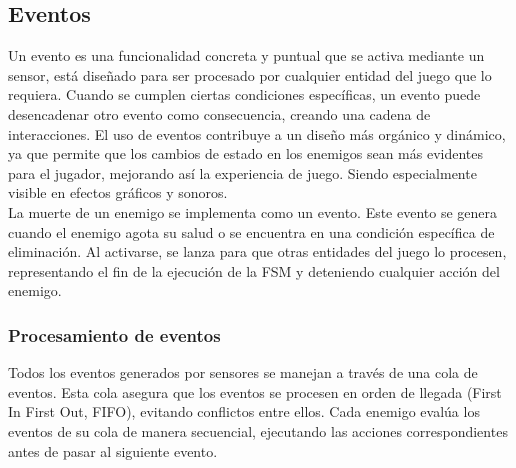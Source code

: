 \subsection{Eventos}

Un evento es una funcionalidad concreta y puntual que se activa mediante un sensor, está diseñado para ser procesado por cualquier entidad del juego que lo requiera.
Cuando se cumplen ciertas condiciones específicas, un evento puede desencadenar otro evento como consecuencia, creando una cadena de interacciones.
El uso de eventos contribuye a un diseño más orgánico y dinámico, ya que permite que los cambios de estado en los enemigos sean más evidentes para el jugador, mejorando así la experiencia de juego. Siendo especialmente visible en efectos gráficos y sonoros.\\

La muerte de un enemigo se implementa como un evento. Este evento se genera cuando el enemigo agota su salud o se encuentra en una condición específica de eliminación. Al activarse, se lanza para que otras entidades del juego lo procesen, representando el fin de la ejecución de la FSM y deteniendo cualquier acción del enemigo.

\subsubsection{Procesamiento de eventos}

Todos los eventos generados por sensores se manejan a través de una cola de eventos. Esta cola asegura que los eventos se procesen en orden de llegada (First In First Out, FIFO), evitando conflictos entre ellos. Cada enemigo evalúa los eventos de su cola de manera secuencial, ejecutando las acciones correspondientes antes de pasar al siguiente evento.

